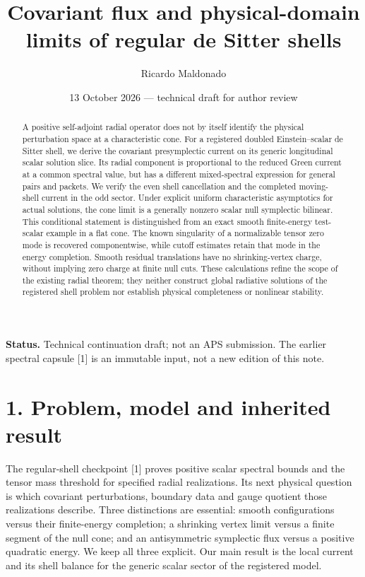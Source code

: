 \documentclass[
  11pt,
]{article}
\title{Covariant flux and physical-domain limits of regular de Sitter
shells}
\author{Ricardo Maldonado}
\date{13 October 2026 --- technical draft for author review}
\begin{document}
\maketitle
\begin{abstract}
A positive self-adjoint radial operator does not by itself identify the
physical perturbation space at a characteristic cone. For a registered
doubled Einstein--scalar de Sitter shell, we derive the covariant
presymplectic current on its generic longitudinal scalar solution slice.
Its radial component is proportional to the reduced Green current at a
common spectral value, but has a different mixed-spectral expression for
general pairs and packets. We verify the even shell cancellation and the
completed moving-shell current in the odd sector. Under explicit uniform
characteristic asymptotics for actual solutions, the cone limit is a
generally nonzero scalar null symplectic bilinear. This conditional
statement is distinguished from an exact smooth finite-energy
test-scalar example in a flat cone. The known singularity of a
normalizable tensor zero mode is recovered componentwise, while cutoff
estimates retain that mode in the energy completion. Smooth residual
translations have no shrinking-vertex charge, without implying zero
charge at finite null cuts. These calculations refine the scope of the
existing radial theorem; they neither construct global radiative
solutions of the registered shell problem nor establish physical
completeness or nonlinear stability.
\end{abstract}

\textbf{Status.} Technical continuation draft; not an APS submission.
The earlier spectral capsule {[}1{]} is an immutable input, not a new
edition of this note.

\section{1. Problem, model and inherited
result}\label{problem-model-and-inherited-result}

The regular-shell checkpoint {[}1{]} proves positive scalar spectral
bounds and the tensor mass threshold for specified radial realizations.
Its next physical question is which covariant perturbations, boundary
data and gauge quotient those realizations describe. Three distinctions
are essential: smooth configurations versus their finite-energy
completion; a shrinking vertex limit versus a finite segment of the null
cone; and an antisymmetric symplectic flux versus a positive quadratic
energy. We keep all three explicit. Our main result is the local current
and its shell balance for the generic scalar sector of the registered
model.
\end{document}
